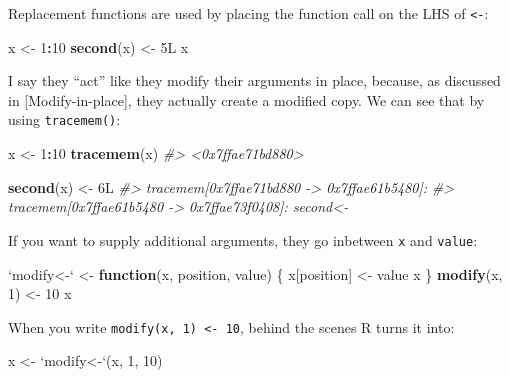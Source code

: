 \documentclass[]{book}
\newenvironment{Shaded}{\begin{snugshade}}{\end{snugshade}}
\newcommand{\KeywordTok}[1]{\textcolor[rgb]{0.13,0.29,0.53}{\textbf{#1}}}
\newcommand{\DataTypeTok}[1]{\textcolor[rgb]{0.13,0.29,0.53}{#1}}
\newcommand{\DecValTok}[1]{\textcolor[rgb]{0.00,0.00,0.81}{#1}}
\newcommand{\StringTok}[1]{\textcolor[rgb]{0.31,0.60,0.02}{#1}}
\newcommand{\CommentTok}[1]{\textcolor[rgb]{0.56,0.35,0.01}{\textit{#1}}}
\newcommand{\ControlFlowTok}[1]{\textcolor[rgb]{0.13,0.29,0.53}{\textbf{#1}}}
\newcommand{\OperatorTok}[1]{\textcolor[rgb]{0.81,0.36,0.00}{\textbf{#1}}}
\newcommand{\NormalTok}[1]{#1}
\theoremstyle{definition}
\theoremstyle{definition}
\theoremstyle{definition}
\theoremstyle{remark}
\begin{document}
Replacement functions are used by placing the function call on the LHS
of \texttt{\textless{}-}:

\begin{Shaded}
\begin{Highlighting}[]
\NormalTok{x <-}\StringTok{ }\DecValTok{1}\OperatorTok{:}\DecValTok{10}
\KeywordTok{second}\NormalTok{(x) <-}\StringTok{ }\NormalTok{5L}
\NormalTok{x}
\end{Highlighting}
\end{Shaded}

I say they ``act'' like they modify their arguments in place, because,
as discussed in {[}Modify-in-place{]}, they actually create a modified
copy. We can see that by using \texttt{tracemem()}:

\begin{Shaded}
\begin{Highlighting}[]
\NormalTok{x <-}\StringTok{ }\DecValTok{1}\OperatorTok{:}\DecValTok{10}
\KeywordTok{tracemem}\NormalTok{(x)}
\CommentTok{#> <0x7ffae71bd880>}

\KeywordTok{second}\NormalTok{(x) <-}\StringTok{ }\NormalTok{6L}
\CommentTok{#> tracemem[0x7ffae71bd880 -> 0x7ffae61b5480]: }
\CommentTok{#> tracemem[0x7ffae61b5480 -> 0x7ffae73f0408]: second<- }
\end{Highlighting}
\end{Shaded}

If you want to supply additional arguments, they go inbetween \texttt{x}
and \texttt{value}:

\begin{Shaded}
\begin{Highlighting}[]
\StringTok{`}\DataTypeTok{modify<-}\StringTok{`}\NormalTok{ <-}\StringTok{ }\ControlFlowTok{function}\NormalTok{(x, position, value) \{}
\NormalTok{  x[position] <-}\StringTok{ }\NormalTok{value}
\NormalTok{  x}
\NormalTok{\}}
\KeywordTok{modify}\NormalTok{(x, }\DecValTok{1}\NormalTok{) <-}\StringTok{ }\DecValTok{10}
\NormalTok{x}
\end{Highlighting}
\end{Shaded}

When you write \texttt{modify(x,\ 1)\ \textless{}-\ 10}, behind the
scenes R turns it into:

\begin{Shaded}
\begin{Highlighting}[]
\NormalTok{x <-}\StringTok{ `}\DataTypeTok{modify<-}\StringTok{`}\NormalTok{(x, }\DecValTok{1}\NormalTok{, }\DecValTok{10}\NormalTok{)}
\end{Highlighting}
\end{Shaded}
\end{document}

